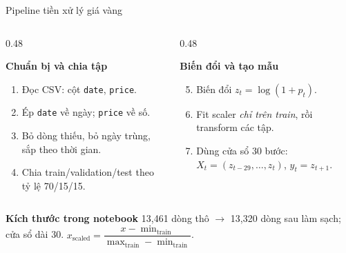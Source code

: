 \documentclass[aspectratio=169, 10pt]{beamer}
\begin{document}
\begin{frame}{Pipeline tiền xử lý giá vàng}
\small
\begin{columns}[T]
\begin{column}{0.48\textwidth}
\begin{block}{\textbf{Chuẩn bị và chia tập}}
\begin{enumerate}
\item Đọc CSV: cột \texttt{date}, \texttt{price}.
\item Ép \texttt{date} về ngày; \texttt{price} về số.
\item Bỏ dòng thiếu, bỏ ngày trùng, sắp theo thời gian.
\item Chia train/validation/test theo tỷ lệ 70/15/15.
\end{enumerate}
\end{block}
\end{column}
\begin{column}{0.48\textwidth}
\begin{exampleblock}{\textbf{Biến đổi và tạo mẫu}}
\begin{enumerate}
\setcounter{enumi}{4}
\item Biến đổi $z_t=\log(1+p_t)$.
\item Fit scaler \emph{chỉ trên train}, rồi transform các tập.
\item Dùng cửa sổ 30 bước: $X_t=(z_{t-29},\ldots,z_t)$, $y_t=z_{t+1}$.
\end{enumerate}
\end{exampleblock}
\end{column}
\end{columns}
\vspace{0.2cm}
\begin{alertblock}{\textbf{Kích thước trong notebook}}
13,461 dòng thô $\rightarrow$ 13,320 dòng sau làm sạch; cửa sổ dài 30.\quad
$x_{\mathrm{scaled}}=\dfrac{x-\min_{\mathrm{train}}}{\max_{\mathrm{train}}-\min_{\mathrm{train}}}$.
\end{alertblock}
\end{frame}
\end{document}
